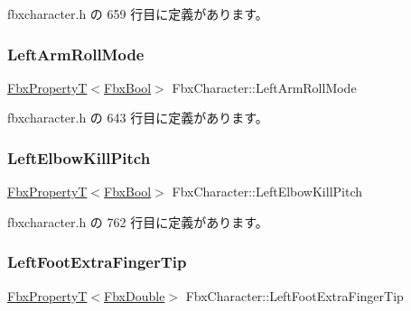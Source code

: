  fbxcharacter.\+h の 659 行目に定義があります。

\mbox{\label{class_fbx_character_a14cf83f4c540a9529627a471a3538b38}} 
\subsubsection{\texorpdfstring{Left\+Arm\+Roll\+Mode}{LeftArmRollMode}}
{\footnotesize\ttfamily \hyperlink{class_fbx_property_t}{Fbx\+PropertyT}$<$\hyperlink{fbxtypes_8h_a92e0562b2fe33e76a242f498b362262e}{Fbx\+Bool}$>$ Fbx\+Character\+::\+Left\+Arm\+Roll\+Mode}



 fbxcharacter.\+h の 643 行目に定義があります。

\mbox{\label{class_fbx_character_a9192ea2f1abda7959f6015c26f6b2cdb}} 
\subsubsection{\texorpdfstring{Left\+Elbow\+Kill\+Pitch}{LeftElbowKillPitch}}
{\footnotesize\ttfamily \hyperlink{class_fbx_property_t}{Fbx\+PropertyT}$<$\hyperlink{fbxtypes_8h_a92e0562b2fe33e76a242f498b362262e}{Fbx\+Bool}$>$ Fbx\+Character\+::\+Left\+Elbow\+Kill\+Pitch}



 fbxcharacter.\+h の 762 行目に定義があります。

\mbox{\label{class_fbx_character_a70d4aa45dea8298f6d183758e3455d66}} 
\subsubsection{\texorpdfstring{Left\+Foot\+Extra\+Finger\+Tip}{LeftFootExtraFingerTip}}
{\footnotesize\ttfamily \hyperlink{class_fbx_property_t}{Fbx\+PropertyT}$<$\hyperlink{fbxtypes_8h_a171e72a1c46fc15c1a6c9c31948c1c5b}{Fbx\+Double}$>$ Fbx\+Character\+::\+Left\+Foot\+Extra\+Finger\+Tip}




